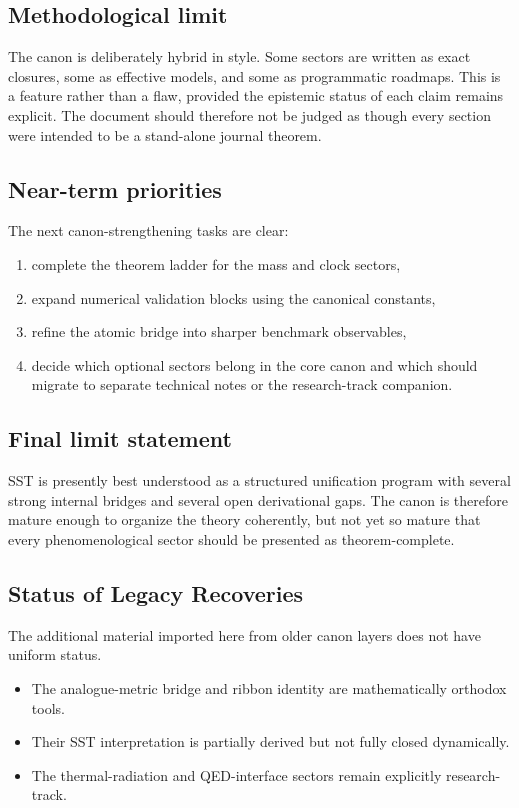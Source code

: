 \documentclass[11pt]{article}
\theoremstyle{definition}
\theoremstyle{plain}
\theoremstyle{remark}
\begin{document}
    \subsection{Methodological limit}
        The canon is deliberately hybrid in style. Some sectors are written as exact closures, some as effective models, and some as programmatic roadmaps. This is a feature rather than a flaw, provided the epistemic status of each claim remains explicit. The document should therefore not be judged as though every section were intended to be a stand-alone journal theorem.

    \subsection{Near-term priorities}
        The next canon-strengthening tasks are clear:
        \begin{enumerate}
            \item complete the theorem ladder for the mass and clock sectors,
            \item expand numerical validation blocks using the canonical constants,
            \item refine the atomic bridge into sharper benchmark observables,
            \item decide which optional sectors belong in the core canon and which should migrate to separate technical notes or the research-track companion.
        \end{enumerate}

    \subsection{Final limit statement}
        SST is presently best understood as a structured unification program with several strong internal bridges and several open derivational gaps. The canon is therefore mature enough to organize the theory coherently, but not yet so mature that every phenomenological sector should be presented as theorem-complete.

    \subsection{Status of Legacy Recoveries}

        The additional material imported here from older canon layers does not have uniform status.

        \begin{itemize}
            \item The analogue-metric bridge and ribbon identity are mathematically orthodox tools.
            \item Their SST interpretation is partially derived but not fully closed dynamically.
            \item The thermal-radiation and QED-interface sectors remain explicitly research-track.
        \end{itemize}
\end{document}
